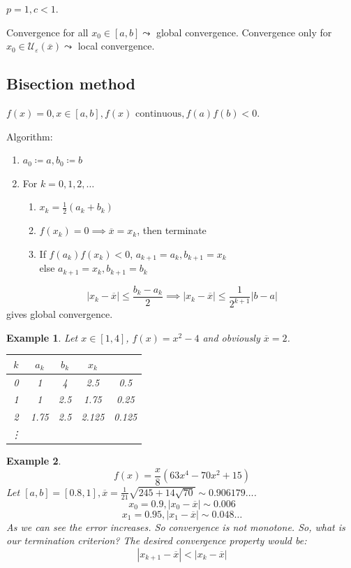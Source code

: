 \documentclass{article}
\newtheorem{example}{Example}
\newcommand{\card}[1]{\left|#1\right|}
\begin{document}
$p=1, c < 1$.

Convergence for all $x_0 \in [a,b] \leadsto$ global convergence.
Convergence only for $x_0 \in \mathcal U_\varepsilon(\overline x) \leadsto$ local convergence.

\subsection{Bisection method}

$f(x) = 0, x \in [a,b], f(x) \text{ continuous}, f(a) f(b) < 0$.

Algorithm:
\begin{enumerate}
  \item $a_0 \coloneqq a, b_0 \coloneqq b$
  \item For $k = 0,1,2,\ldots$
  \begin{enumerate}
    \item $x_k = \frac12 (a_k + b_k)$
    \item $f(x_k) = 0 \implies \overline x = x_k$, then terminate
    \item If $f(a_k) f(x_k) < 0$, $a_{k+1} = a_k, b_{k+1} = x_k$ \\ else $a_{k+1} = x_k, b_{k+1} = b_k$
  \end{enumerate}
\end{enumerate}

\[ \card{x_k - \overline x} \leq \frac{b_k - a_k}{2} \implies \card{x_k - \overline x} \leq \frac1{2^{k+1}} \card{b - a} \]
gives global convergence.

\begin{example}
  Let $x \in [1,4]$, $f(x) = x^2 - 4$ and obviously $\overline x = 2$.

  \begin{center}
    \begin{tabular}{ccccc}
      $k$ & $a_k$ & $b_k$ & $x_k$ \\
    \hline
      0 & 1 & 4 & 2.5 & 0.5 \\
      1 & 1 & 2.5 & 1.75 & 0.25 \\
      2 & 1.75 & 2.5 & 2.125 & 0.125 \\
      \vdots
    \end{tabular}
  \end{center}
\end{example}

\begin{example}
  \[ f(x) = \frac x8 (63x^4 - 70x^2 + 15) \]
  Let $[a,b] = [0.8,1], \overline x = \frac1{21} \sqrt{245 + 14\sqrt{70}} \sim 0.906179\ldots$.
  \[ x_0 = 0.9, \card{x_0 - \overline x} \sim 0.006 \]
  \[ x_1 = 0.95, \card{x_1 - \overline x} \sim 0.048\dots \]
  As we can see the error increases. So convergence is not monotone. So, what is our termination criterion?
  The desired convergence property would be:
  \[ \card{x_{k+1} - \overline x} < \card{x_k - \overline x} \]
\end{example}
\end{document}
